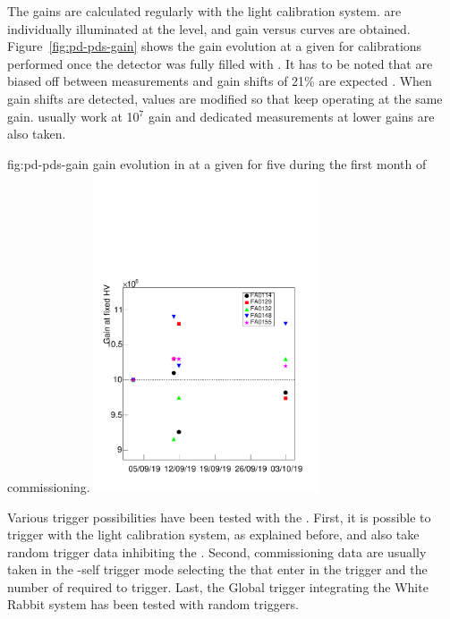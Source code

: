 The  gains are calculated regularly with the light calibration system.  are individually illuminated at the  level, and gain versus   curves are obtained. Figure~\ref{fig:pd-pds-gain} shows the gain evolution at a given  for calibrations performed once the detector was fully filled with . It has to be noted that  are biased off between measurements and gain shifts of 21\% are expected \cite{Belver:2018erf}. When gain shifts are detected,  values are modified so that  keep operating at the same gain.  usually work at 10$^7$ gain and dedicated measurements at lower gains are also taken.

\begin{dunefigure}{fig:pd-pds-gain} { gain evolution in  at a given  for five  during the first month of commissioning.}
\includegraphics[width=0.5\textwidth]{graphics/dppd_gain.pdf}
\end{dunefigure}

Various trigger possibilities have been tested with the  . First, it is possible to trigger with the light calibration system, as explained before, and also take random trigger data inhibiting the . Second, commissioning data are usually taken in the -self trigger mode selecting the  that enter in the trigger and the number of  required to trigger. Last, the Global  trigger integrating the White Rabbit system has been tested with random triggers.


